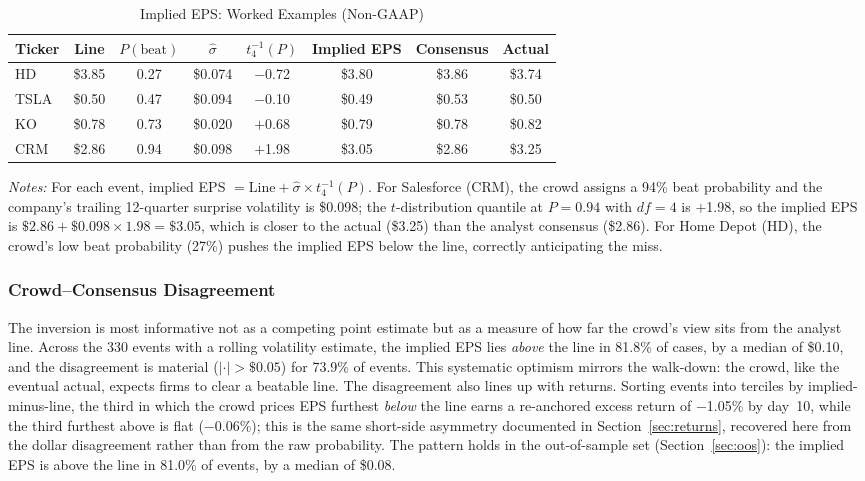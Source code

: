 \documentclass[11pt]{article}
\begin{document}
\begin{table}[htbp]
\centering
\begin{threeparttable}
\caption{Implied EPS: Worked Examples (Non-GAAP)}
\label{tab:implied_example}
\begin{tabular}{lccccccc}
\toprule
Ticker & Line & $P(\text{beat})$ & $\hat{\sigma}$ & $t^{-1}_4(P)$ & Implied EPS & Consensus & Actual \\
\midrule
HD & \$3.85 & 0.27 & \$0.074 & $-$0.72 & \$3.80 & \$3.86 & \$3.74 \\
TSLA & \$0.50 & 0.47 & \$0.094 & $-$0.10 & \$0.49 & \$0.53 & \$0.50 \\
KO & \$0.78 & 0.73 & \$0.020 & $+$0.68 & \$0.79 & \$0.78 & \$0.82 \\
CRM & \$2.86 & 0.94 & \$0.098 & $+$1.98 & \$3.05 & \$2.86 & \$3.25 \\
\bottomrule
\end{tabular}
\begin{tablenotes}
\small
\item \textit{Notes:} For each event, implied EPS $= \text{Line} + \hat{\sigma} \times t^{-1}_4(P)$. For Salesforce (CRM), the crowd assigns a 94\% beat probability and the company's trailing 12-quarter surprise volatility is \$0.098; the $t$-distribution quantile at $P = 0.94$ with $df = 4$ is $+$1.98, so the implied EPS is $\$2.86 + \$0.098 \times 1.98 = \$3.05$, which is closer to the actual (\$3.25) than the analyst consensus (\$2.86). For Home Depot (HD), the crowd's low beat probability (27\%) pushes the implied EPS below the line, correctly anticipating the miss.
\end{tablenotes}
\end{threeparttable}
\end{table}

\subsubsection{Crowd--Consensus Disagreement}

The inversion is most informative not as a competing point estimate but as a measure of how far the crowd's view sits from the analyst line. Across the 330 events with a rolling volatility estimate, the implied EPS lies \textit{above} the line in 81.8\% of cases, by a median of \$0.10, and the disagreement is material ($|{\cdot}| > \$0.05$) for 73.9\% of events. This systematic optimism mirrors the walk-down: the crowd, like the eventual actual, expects firms to clear a beatable line. The disagreement also lines up with returns. Sorting events into terciles by implied-minus-line, the third in which the crowd prices EPS furthest \textit{below} the line earns a re-anchored excess return of $-$1.05\% by day~10, while the third furthest above is flat ($-$0.06\%); this is the same short-side asymmetry documented in Section~\ref{sec:returns}, recovered here from the dollar disagreement rather than from the raw probability. The pattern holds in the out-of-sample set (Section~\ref{sec:oos}): the implied EPS is above the line in 81.0\% of events, by a median of \$0.08.
\end{document}
